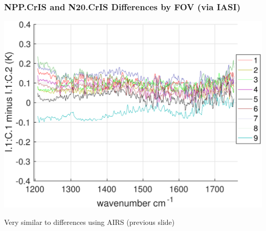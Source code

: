 \documentclass[10pt,t]{beamer}
\begin{document}
\begin{frame}
  \frametitle{NPP.CrIS and N20.CrIS Differences by FOV (via IASI)}
  \begin{center}
    \includegraphics[width=0.85\linewidth]{./Figs/sno_i1c1_i1c2_dble_diff_lr_mw_2018febjun_aslp.pdf}
  \end{center}
\small Very similar to differences using AIRS (previous slide)  
\end{frame}
  
\end{document}
